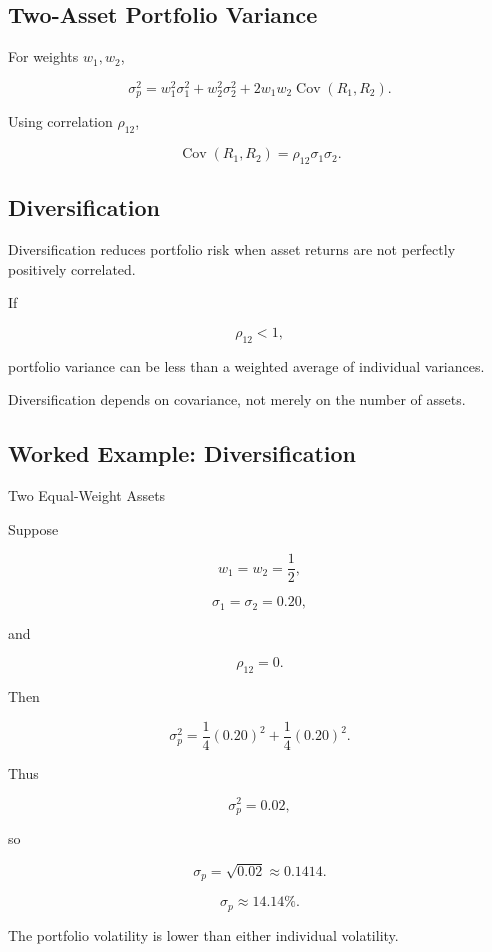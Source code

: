 \subsection{Two-Asset Portfolio Variance}
\label{subsec:two-asset-variance}

For weights \(w_1,w_2\),

\[
\boxed{
\sigma_p^2
=
w_1^2\sigma_1^2
+
w_2^2\sigma_2^2
+
2w_1w_2
\operatorname{Cov}(R_1,R_2).
}
\]

Using correlation \(\rho_{12}\),

\[
\boxed{
\operatorname{Cov}(R_1,R_2)
=
\rho_{12}\sigma_1\sigma_2.
}
\]

\subsection{Diversification}
\label{subsec:financial-diversification}

Diversification reduces portfolio risk when asset returns are not perfectly
positively correlated.

If

\[
\rho_{12}<1,
\]

portfolio variance can be less than a weighted average of individual
variances.

Diversification depends on covariance, not merely on the number of assets.

\subsection{Worked Example: Diversification}
\label{subsec:worked-diversification}

\begin{workedexamplebox}{Two Equal-Weight Assets}

Suppose

\[
w_1=w_2=\frac12,
\]

\[
\sigma_1=\sigma_2=0.20,
\]

and

\[
\rho_{12}=0.
\]

Then

\[
\sigma_p^2
=
\frac14(0.20)^2
+
\frac14(0.20)^2.
\]

Thus

\[
\sigma_p^2
=
0.02,
\]

so

\[
\sigma_p
=
\sqrt{0.02}
\approx0.1414.
\]

\begin{answerbox}
\[
\boxed{
\sigma_p\approx14.14\%.
}
\]
\end{answerbox}

The portfolio volatility is lower than either individual volatility.

\end{workedexamplebox}

